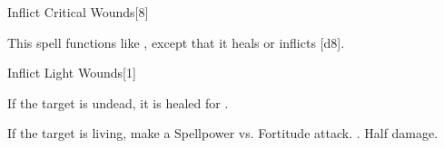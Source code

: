 \begin{spellsection}[Mass]{Inflict Critical Wounds}[8]
    \begin{spellheader}
    \end{spellheader}
    \begin{spellcontent}
        \begin{spelltargetinginfo}
        \end{spelltargetinginfo}
        \begin{spelleffects}
            \spellspecial This spell functions like , except that it heals or inflicts \spelldamage{}[d8].
        \end{spelleffects}
    \end{spellcontent}
    \begin{spellfooter}
        \miscastexplode
    \end{spellfooter}
\end{spellsection}

\begin{spellsection}{Inflict Light Wounds}[1]
    \begin{spellheader}
    \end{spellheader}
    \begin{spellcontent}
        \begin{spelltargetinginfo}
        \end{spelltargetinginfo}
        \begin{spelleffects}
            \spelleffect If the target is undead, it is healed for \spelldamage{}.
            \begin{spellattacktriggered}{If the target is living, make a Spellpower vs. Fortitude attack.}
                \spellsuccess {}.
                \spellfailure Half damage.
            \end{spellattacktriggered}
        \end{spelleffects}
    \end{spellcontent}
    \begin{spellfooter}
        \miscastrandom
    \end{spellfooter}
\end{spellsection}

